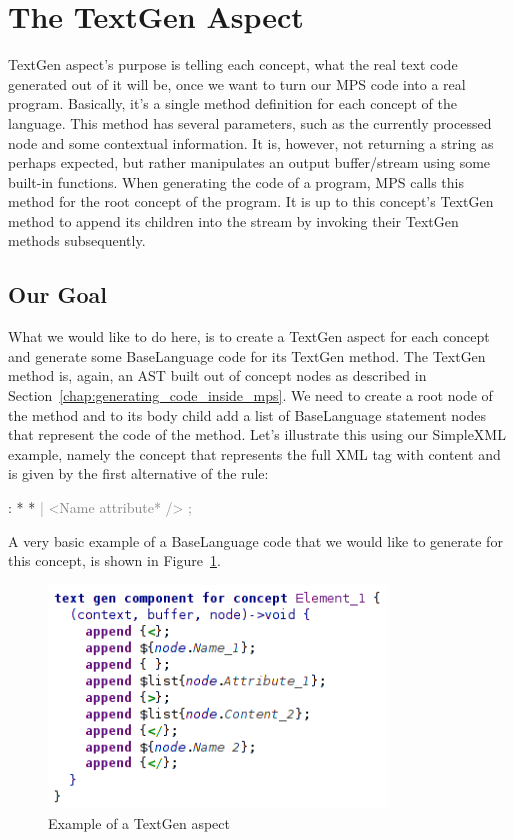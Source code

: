 \section{The TextGen Aspect}
\label{chap:textgen}

TextGen aspect's purpose is telling each concept, what the real text code generated out of it will be, once we want to turn our MPS code into a real program.
Basically, it's a single method definition for each concept of the language.
This method has several parameters, such as the currently processed node and some contextual information.
It is, however, not returning a string as perhaps expected, but rather manipulates an output buffer/stream using some built-in functions.
When generating the code of a program, MPS calls this method for the root concept of the program.
It is up to this concept's TextGen method to append its children into the stream by invoking their TextGen methods subsequently.

\subsection{Our Goal}

What we would like to do here, is to create a TextGen aspect for each concept and generate some BaseLanguage code for its TextGen method.
The TextGen method is, again, an AST built out of concept nodes as described in Section~\ref{chap:generating_code_inside_mps}.
We need to create a root node of the method and to its body child add a list of BaseLanguage statement nodes that represent the code of the method.
Let's illustrate this using our SimpleXML example, namely the  concept that represents the full XML tag with content and is given by the first alternative of the  rule:

\begin{antlr}
	   :   \literal{<}  * \literal{>} * \literal{</}  \literal{>}
          \textcolor{gray}{|   \ap<\ap Name attribute* \ap/>\ap}
          \textcolor{gray}{;}
\end{antlr}

A very basic example of a BaseLanguage code that we would like to generate for this concept, is shown in Figure~\ref{fig:textgen_example}.

\begin{figure}[h]
	\centering
	\includegraphics[width=90mm]{./img/textgen_example.png}
	\caption{Example of a TextGen aspect}
	\label{fig:textgen_example}
\end{figure}

